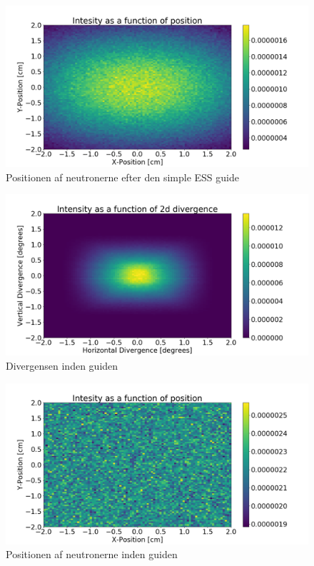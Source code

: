 \documentclass[12pt,oneside,a4paper]{article}
\begin{document}
{{{{{\begin{figure}[H]
\centering
\includegraphics[width=1\textwidth]{psd_ess_simple_after.png}
\caption{Positionen af neutronerne efter den simple ESS guide}
\end{figure}


\begin{figure}[H]
\centering
\includegraphics[width=1\textwidth]{div_ess_simple_before.png}
\caption{Divergensen inden guiden}
\end{figure}

\begin{figure}[H]
\centering
\includegraphics[width=1\textwidth]{psd_ess_simple_before.png}
\caption{Positionen af neutronerne inden guiden}
\end{figure}



}}}}}
\end{document}
